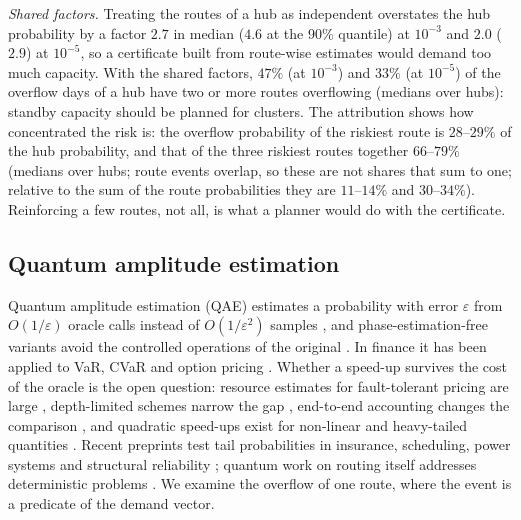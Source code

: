 \documentclass[11pt]{article}
\theoremstyle{definition}
\theoremstyle{remark}
\begin{document}
\emph{Shared factors.} Treating the routes of a hub as independent
overstates the hub probability by a factor $2.7$ in median ($4.6$ at the 90\%
quantile) at $10^{-3}$ and $2.0$ ($2.9$) at $10^{-5}$, so a certificate built
from route-wise estimates would demand too much capacity. With the shared
factors, $47\%$ (at $10^{-3}$) and $33\%$ (at $10^{-5}$) of the overflow days
of a hub have two or more routes overflowing (medians over hubs): standby
capacity should be planned for clusters. The attribution shows how
concentrated the risk is: the overflow probability of the riskiest route is
$28$--$29\%$ of the hub probability, and that of the three riskiest routes
together $66$--$79\%$ (medians over hubs; route events overlap, so these are
not shares that sum to one; relative to the sum of the route probabilities they
are $11$--$14\%$ and $30$--$34\%$). Reinforcing a few routes, not all, is what
a planner would do with the certificate.

\subsection{Quantum amplitude estimation}
\label{sec:quantum}
Quantum amplitude estimation (QAE) estimates a probability with error $\varepsilon$
from $O(1/\varepsilon)$ oracle calls instead of $O(1/\varepsilon^{2})$ samples
\citep{Brassard2002,Montanaro2015}, and phase-estimation-free variants avoid the
controlled operations of the original \citep{Suzuki2020Amplitude,Grinko2021Iterative}.
In finance it has been applied to VaR, CVaR and option pricing
\citep{Woerner2019Quantum,Stamatopoulos2020Option,Egger2021Credit}. Whether a
speed-up survives the cost of the oracle is the open question: resource estimates
for fault-tolerant pricing are large \citep{Chakrabarti2021Threshold}, depth-limited
schemes narrow the gap \citep{Herbert2022Quantum}, end-to-end accounting changes the
comparison \citep{Dalzell2023Survey}, and quadratic speed-ups exist for non-linear and
heavy-tailed quantities \citep{Blanchet2025Quantum}. Recent preprints test tail
probabilities in insurance, scheduling, power systems and structural reliability
\citep{Kirke2026Quantum,Srikant2026Quantum,Jong2023Quantum,Tabarraei2026Bayesian};
quantum work on routing itself addresses deterministic problems
\citep{Feld2019Hybrid,Fitzek2024Applying,Phillipson2024Quantum}. We examine the
overflow of one route, where the event is a predicate of the demand vector.
\end{document}
